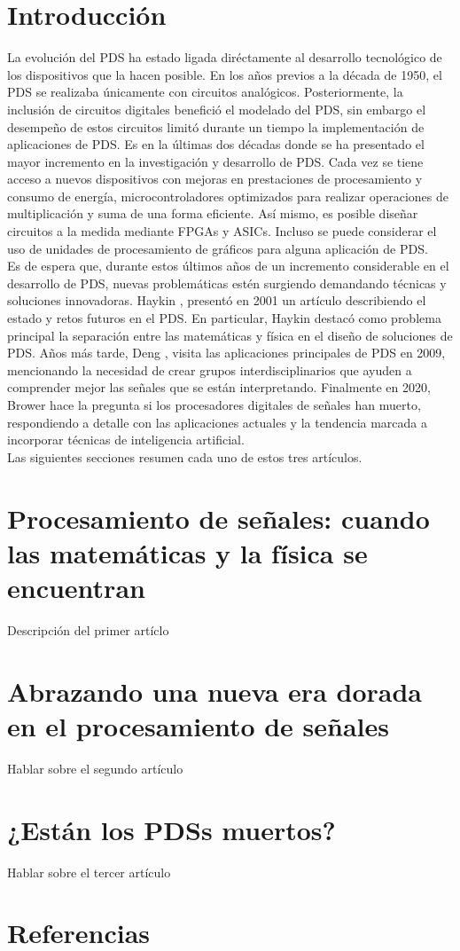 \documentclass[11pt, twocolumn]{article}
\begin{document}
\section{Introducción}
La evolución del PDS ha estado ligada diréctamente al desarrollo tecnológico de los dispositivos que la hacen posible. En los años previos a la década de 1950, el PDS se realizaba únicamente con circuitos analógicos. Posteriormente, la inclusión de circuitos digitales benefició el modelado del PDS, sin embargo el desempeño de estos circuitos limitó durante un tiempo la implementación de aplicaciones de PDS. Es en la últimas dos décadas donde se ha presentado el mayor incremento en la investigación y desarrollo de PDS. Cada vez se tiene acceso a nuevos dispositivos con mejoras en prestaciones de procesamiento y consumo de energía, microcontroladores optimizados para realizar operaciones de multiplicación y suma de una forma eficiente. Así mismo, es posible diseñar circuitos a la medida mediante FPGAs y ASICs. Incluso se puede considerar el uso de unidades de procesamiento de gráficos para alguna aplicación de PDS.\\

Es de espera que, durante estos últimos años de un incremento considerable en el desarrollo de PDS, nuevas problemáticas estén surgiendo demandando técnicas y soluciones innovadoras. Haykin \cite{haykin}, presentó en 2001 un artículo describiendo el estado y retos futuros en el PDS. En particular, Haykin destacó como problema principal la separación entre las matemáticas y física en el diseño de soluciones de PDS. Años más tarde, Deng \cite{golden_age}, visita las aplicaciones principales de PDS en 2009, mencionando la necesidad de crear grupos interdisciplinarios que ayuden a comprender mejor las señales que se están interpretando. Finalmente en 2020, Brower \cite{dps_dead} hace la pregunta si los procesadores digitales de señales han muerto, respondiendo a detalle con las aplicaciones actuales y la tendencia marcada a incorporar técnicas de inteligencia artificial.\\

Las siguientes secciones resumen cada uno de estos tres artículos.

\section{Procesamiento de señales: cuando las matemáticas y la física se encuentran}
Descripción del primer artíclo

\section{Abrazando una nueva era dorada en el procesamiento de señales}
Hablar sobre el segundo artículo

\section{¿Están los PDSs muertos?}
Hablar sobre el tercer artículo


\section{Referencias}



\end{document}
